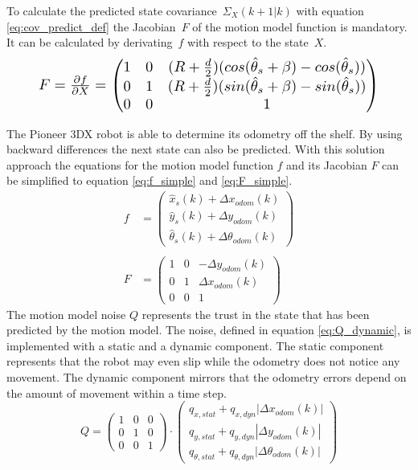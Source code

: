 To calculate the predicted state \mbox{covariance $\Sigma_{X}(k+1|k)$} with equation \eqref{eq:cov_predict_def} the \mbox{Jacobian $F$} of the motion model function is mandatory. It can be calculated by \mbox{derivating $f$} with respect to the \mbox{state $X$.} \cite{Maneewarn}
\begin{equation}\label{eq:MotionModel}
    \resizebox{0.88\hsize}{!}{%
        $F = \frac{\partial f}{\partial X} = \begin{pmatrix} 1 & 0 & (R+{\frac{d}{2}})(cos(\hat{\theta}_s+ \beta)-cos(\hat{\theta}_s)) \\ 0 & 1 & (R+\frac{d}{2})(sin(\hat{\theta}_s+ \beta)-sin(\hat{\theta}_s)) \\ 0 & 0 & 1\end{pmatrix}$%
        }
\end{equation}

The Pioneer 3DX robot is able to determine its odometry off the shelf. By using backward differences the next state can also be predicted. With this solution approach the equations for the motion model function $f$ and its Jacobian $F$ can be simplified to equation \eqref{eq:f_simple} and \eqref{eq:F_simple}. 
\begin{align}
f &= \begin{pmatrix} \hat{x}_s(k) + \Delta x_{odom}(k) \\ \hat{y}_s(k) + \Delta y_{odom}(k) \\ \hat{\theta}_s(k) + \Delta \theta_{odom}(k)\end{pmatrix}
\label{eq:f_simple} \\ \nonumber \\
F &= \begin{pmatrix} 1 & 0 & - \Delta y_{odom}(k) \\ 0 & 1 & \Delta x_{odom}(k) \\ 0 & 0 & 1\end{pmatrix} \label{eq:F_simple}
\end{align}
The motion model noise $Q$ represents the trust in the state that has been predicted by the motion model. The noise, defined in equation \eqref{eq:Q_dynamic}, is implemented with a static and a dynamic component. The static component represents that the robot may even slip while the odometry does not notice any movement. The dynamic component mirrors that the odometry errors depend on the amount of movement within a time step.
\begin{equation}
Q = \begin{pmatrix} 1 & 0 & 0 \\ 0 & 1 & 0 \\ 0 & 0 & 1\end{pmatrix} \cdot \begin{pmatrix} q_{x,stat} + q_{x,dyn} |\Delta x_{odom}(k)| \\ q_{y,stat} + q_{y,dyn} |\Delta y_{odom}(k)|  \\ q_{\theta,stat} + q_{\theta,dyn} |\Delta \theta_{odom}(k)| \end{pmatrix}
\label{eq:Q_dynamic}
\end{equation}


